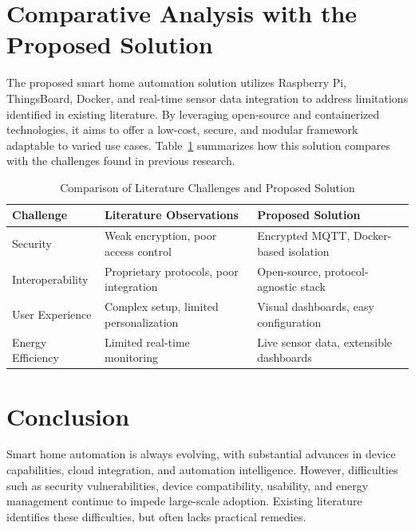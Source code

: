 \documentclass[a4paper,12pt]{report}
\begin{document}
 \section{Comparative Analysis with the Proposed Solution}

The proposed smart home automation solution utilizes Raspberry Pi, ThingsBoard, Docker, and real-time sensor data integration to address limitations identified in existing literature. By leveraging open-source and containerized technologies, it aims to offer a low-cost, secure, and modular framework adaptable to varied use cases. Table~\ref{tab:comparison} summarizes how this solution compares with the challenges found in previous research.

\begin{table}[htbp]
    \centering
    \renewcommand{\arraystretch}{1.5} %
    \setlength{\tabcolsep}{8pt}       %
    \begin{tabular}{|>{\centering\arraybackslash}m{3cm}|
                    >{\centering\arraybackslash}m{5.5cm}|
                    >{\centering\arraybackslash}m{5.5cm}|}
    \hline
    \textbf{Challenge} & \textbf{Literature Observations} & \textbf{Proposed Solution} \\
    \hline
    Security & Weak encryption, poor access control & Encrypted MQTT, Docker-based isolation \\
    \hline
    Interoperability & Proprietary protocols, poor integration & Open-source, protocol-agnostic stack \\
    \hline
    User Experience & Complex setup, limited personalization & Visual dashboards, easy configuration \\
    \hline
    Energy Efficiency & Limited real-time monitoring & Live sensor data, extensible dashboards \\
    \hline
    
    \end{tabular}
    \caption{Comparison of Literature Challenges and Proposed Solution}
    \label{tab:comparison}

\end{table}
    

 
\section{Conclusion}
Smart home automation is always evolving, with substantial advances in device capabilities, cloud integration, and automation intelligence.  However, difficulties such as security vulnerabilities, device compatibility, usability, and energy management continue to impede large-scale adoption.  Existing literature identifies these difficulties, but often lacks practical remedies.
\end{document}
